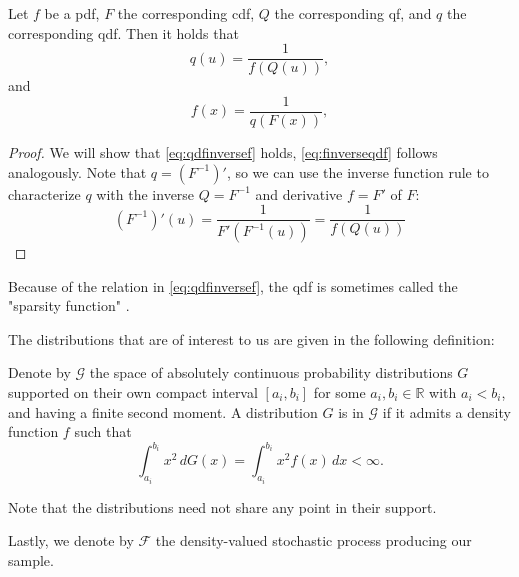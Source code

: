 \begin{lemma}
\label{lemma:f eq inverse qdf}
    Let \(f\) be a pdf, \(F\) the corresponding cdf, \(Q\) the corresponding qf, and
    \(q\) the corresponding qdf. Then it holds that
    \begin{equation}
    \label{eq:qdfinversef}
        {q}(u) = \frac{1}{{f}({Q}(u))},
    \end{equation}
    and
    \begin{equation}
    \label{eq:finverseqdf}
        {f}(x) = \frac{1}{{q}({F}(x))},
    \end{equation}
\end{lemma}
\begin{proof}
    We will show that \eqref{eq:qdfinversef} holds, \eqref{eq:finverseqdf} follows
    analogously. Note that \( q = (F^{-1})' \), so we can use the inverse function
    rule to characterize \(q \) with the inverse $Q = F^{-1}$ and derivative $f = F'$
    of \( F \):
    \begin{equation}
    \label{eq:proof_qdfinversef}
        (F^{-1})'(u) = \frac{1}{{F'}({F^{-1}}(u))} = \frac{1}{{f}({Q}(u))}
    \end{equation}
\end{proof}
Because of the relation in \eqref{eq:qdfinversef}, the qdf is sometimes called the
"sparsity function" \parencite[cf.][]{Tukey1965}.

The distributions that are of interest to us are given in the following definition:
\begin{definition}
    \label{def:spaceD}
    Denote by \( \mathcal{G} \) the space of absolutely continuous probability
    distributions \( G \) supported on their own compact interval \( [a_i, b_i] \)
    for some \( a_i, b_i \in \mathbb{R} \) with \( a_i < b_i \), and having a finite
    second moment. A distribution \( G \) is in \( \mathcal{G} \) if it admits a
    density function \( f \) such that
    \[
        \int_{a_i}^{b_i} x^2 \, dG(x) = \int_{a_i}^{b_i} x^2 f(x) \, dx < \infty.
    \]
\end{definition}
Note that the distributions need not share any point in their support.

Lastly, we denote by $\mathcal{F}$ the density-valued stochastic process producing our
sample.

